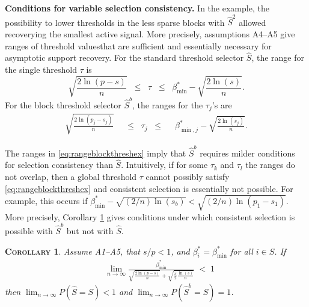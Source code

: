 \documentclass[aos]{imsart}
\theoremstyle{plain}
\newtheorem{cor}[thm]{\textsc{Corollary}}
\begin{document}
\noindent\textbf{Conditions for variable selection consistency.} In the example, the possibility to lower thresholds in the less sparse blocks with $\hat S^2$ allowed recoverying the smallest active signal. %
More precisely, assumptions A4--A5 give ranges of threshold valuesthat are sufficient and essentially necessary for asymptotic support recovery. For the standard threshold selector $\hat{S}$, the range for the single threshold $\tau$ is
\begin{equation}\label{eq:rangethreshex}
  \sqrt{\frac{2\ln(p-s)}{n}}\;\;\leq\;\;\tau\;\;\leq\;\;\beta^*_{\min}-\sqrt{\frac{2\ln(s)}{n}}.	
\end{equation}
For the block threshold selector $\hat{S}^{b}$, 
the ranges for the $\tau_j$'s are
    \begin{eqnarray}\label{eq:rangeblockthreshex}
  \sqrt{\frac{2\ln(p_j-s_j)}{n}}\;\;&\leq\;\;\tau_j\;\;\leq&\;\;\beta^*_{\min,j}-\sqrt{\frac{2\ln(s_j)}{n}}   .
    \end{eqnarray}

The ranges in \eqref{eq:rangeblockthreshex} imply that $\hat{S}^{b}$ requires milder conditions for selection consistency than $\hat{S}$. 
Intuitively, if for some $\tau_k$ and $\tau_l$ the ranges do not overlap, 
then a global threshold $\tau$ cannot possibly satisfy \eqref{eq:rangeblockthreshex} and consistent selection is essentially not possible.
For example, this occurs if $\beta_{\min}^* - \sqrt{(2/n) \ln(s_b)} < \sqrt{(2/n) \ln(p_1-s_1)}$.
More precisely, Corollary \ref{cor:selconstimpossible} gives %
conditions under which consistent selection is possible with $\hat{S}^b$ but not with $\hat{S}$.

\begin{cor}\label{cor:selconstimpossible}
Assume A1--A5, that $s/p<1$, and $\beta^*_i=\beta_{\min}^*$ for all $i \in S$. If
\begin{eqnarray*}
    &\lim_{n\to \infty}\frac{\beta_{\min}^*}{\sqrt{\tfrac{2\ln(p-s)}{n}}+\sqrt{\tfrac{\pi}{2}\tfrac{\ln(s)}{n}}}\;<\; 1 
\end{eqnarray*}
then 
$\lim_{n \rightarrow \infty} P(\hat{S} = S) < 1$ and $\lim_{n \rightarrow \infty} P(\hat{S}^{b} = S)=1$.
\end{cor}
\end{document}
